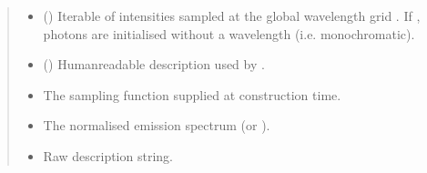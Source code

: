 \documentclass[letterpaper,10pt,english]{sphinxmanual}
\begin{document}
\begin{fulllineitems}
\begin{quote}
\begin{description}
\begin{itemize}
\begin{itemize}
\item {} 
\sphinxAtStartPar
{} \textendash{} Directional cosines .

\end{itemize}

\sphinxAtStartPar
If omitted, the default is a hollow\sphinxhyphen{}cone beam created by
.


\item {} 
\sphinxAtStartPar
{} (\sphinxstyleliteralemphasis{\sphinxupquote{{[}}}\sphinxstyleliteralemphasis{\sphinxupquote{{]} }}\sphinxstyleliteralemphasis{\sphinxupquote{| }}) \textendash{} Iterable of  intensities sampled at the
global wavelength grid .  If , photons are
initialised without a wavelength (i.e. monochromatic).

\item {} 
\sphinxAtStartPar
{} (\sphinxstyleliteralemphasis{\sphinxupquote{ | }}) \textendash{} Human\sphinxhyphen{}readable description used by {\hyperref[\detokenize{generated/photon_canon.optics:photon_canon.optics.Illumination.desc}]{}}.

\end{itemize}

\begin{itemize}
\item {} 
\sphinxAtStartPar
{} \textendash{} The sampling function supplied at construction time.

\item {} 
\sphinxAtStartPar
{} \textendash{} The normalised emission spectrum (or ).

\item {} 
\sphinxAtStartPar
{} \textendash{} Raw description string.

\end{itemize}


\end{description}
\end{quote}
\end{fulllineitems}
\end{document}
